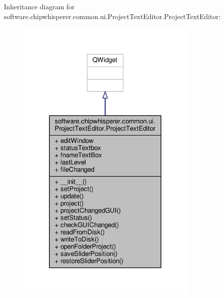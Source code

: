 Inheritance diagram for software.\+chipwhisperer.\+common.\+ui.\+Project\+Text\+Editor.\+Project\+Text\+Editor\+:\nopagebreak
\begin{figure}[H]
\begin{center}
\leavevmode
\includegraphics[width=251pt]{dc/d20/classsoftware_1_1chipwhisperer_1_1common_1_1ui_1_1ProjectTextEditor_1_1ProjectTextEditor__inherit__graph}
\end{center}
\end{figure}


